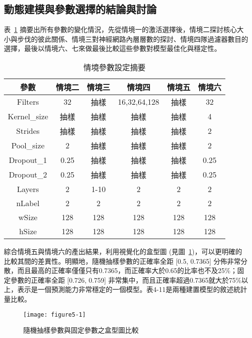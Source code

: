 \documentclass[12pt, a4paper]{article} 				%
\begin{document}
\subsection{動態建模與參數選擇的結論與討論}
表~\ref{Table5-2} 摘要出所有參數的變化情況，先從情境一的激活選擇後，情境二探討核心大小與步伐的彼此關係、情境三對神經網路內層層數的探討、情境四隊過濾器數目的選擇，最後以情境六、七來做最後比較這些參數對模型最佳化與穩定性。

\begin{table}
\begin{center}
\caption{情境參數設定摘要}\label{Table5-2}
\begin{tabular}{cccccc}\toprule
參數	&	情境二	&	情境三	&	情境四	&		情境五&	情境六	\\\midrule
Filters	&	32	&	抽樣	&	16,32,64,128	&	抽樣	&	32	\\
Kernel\_size	&	抽樣	&	抽樣	&	抽樣	&	抽樣	&	4	\\
Strides	&	抽樣	&	抽樣	&	抽樣	&	抽樣	&	2	\\
Pool\_size	&	2	&	抽樣	&	抽樣	&	抽樣	&	2	\\
Dropout\_1	&	0.25	&	抽樣	&	抽樣	&	抽樣	&	0.25	\\
Dropout\_2	&	0.25	&	抽樣	&	抽樣	&	抽樣	&	0.25	\\
Layers	&	2	&	1-10	&	2	&	2	&	2	\\
nLabel	&	2	&	2	&	2	&	2	&	2	\\
wSize	&	128	&	128	&	128	&	128	&	128	\\
hSize	&	128	&	128	&	128	&	128	&	128	\\\bottomrule
\end{tabular}
\end{center}
\end{table}

綜合情境五與情境六的產出結果，利用視覺化的盒型圖 (見圖~\ref{Figure5-1})，可以更明確的比較其間的差異性。明顯地，隨機抽樣參數的正確率全距 [0.5, 0.7365] 分佈非常分散，而且最高的正確率僅僅只有0.7365，而正確率大於0.65的比率也不及25\%；固定參數的正確率全距 [0.726, 0.759] 非常集中，而且正確率超過0.7365就大於75\%以上，表示是一個預測能力非常穩定的一個模型。表4-11是兩種建置模型的敘述統計量比較。

\begin{figure}
\begin{center}
\texttt{[image: figure5-1]}
\caption{隨機抽樣參數與固定參數之盒型圖比較}\label{Figure5-1}
\end{center}
\end{figure}
\end{document}
